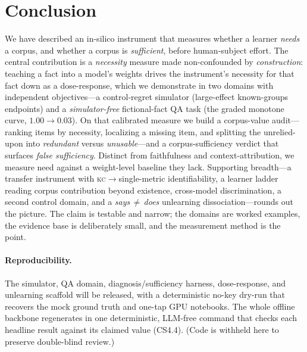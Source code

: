 \documentclass{article}
\newcommand{\kc}{\textsc{kc}}
\begin{document}
\section{Conclusion}
We have described an in-silico instrument that measures whether a learner \emph{needs} a corpus,
and whether a corpus is \emph{sufficient}, before human-subject effort. The central contribution
is a \emph{necessity} measure made non-confounded by \emph{construction}: teaching a fact into a
model's weights drives the instrument's necessity for that fact down as a dose-response, which we
demonstrate in two domains with independent objectives---a control-regret simulator (large-effect
known-groups endpoints) and a \emph{simulator-free} fictional-fact QA task (the graded monotone
curve, $1.00\!\to\!0.03$). On that calibrated measure we build a corpus-value audit---ranking
items by necessity, localizing a missing item, and splitting the unrelied-upon into
\emph{redundant} versus \emph{unusable}---and a corpus-sufficiency verdict that surfaces
\emph{false sufficiency}. Distinct from faithfulness and context-attribution, we measure need
against a weight-level baseline they lack. Supporting breadth---a transfer instrument with
\kc$\to$single-metric identifiability, a learner ladder reading corpus contribution beyond existence,
cross-model discrimination, a second control domain, and a \emph{says\,$\neq$\,does} unlearning
dissociation---rounds out the picture. The claim is testable and narrow; the domains are worked
examples, the evidence base is deliberately small, and the measurement method is the point.

\paragraph{Reproducibility.} The simulator, QA domain, diagnosis/sufficiency harness, dose-response, and
unlearning scaffold will be released, with a deterministic no-key dry-run that recovers the mock ground
truth and one-tap GPU notebooks. The whole offline backbone regenerates in one deterministic, LLM-free
command that checks each headline result against its claimed value (CS4.4). (Code is withheld here to
preserve double-blind review.)

\appendix
\end{document}
